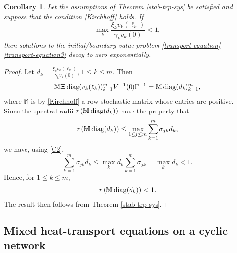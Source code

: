 \documentclass[a4paper,11pt,reqno]{amsart}
\theoremstyle{plain}
\newtheorem{corollary}{Corollary}[section]
\numberwithin{equation}{section}
\begin{document}
\begin{corollary}
Let the assumptions of Theorem \ref{stab-trp-sys} be satisfied and suppose that the condition \eqref{Kirchhoff} holds. If 
\begin{equation}\label{C2}
\max_{k}\frac{\xi_kv_k(\ell_k)}{\gamma_kv_k(0)}<1,
\end{equation}
then solutions to the initial/boundary-value problem \eqref{transport-equation}--\eqref{transport-equation3} decay to zero exponentially.
\end{corollary}
\begin{proof}
Let $d_k = \frac{\xi_kv_k(\ell_k)}{\gamma_kv_k(0)}$, $1 \le k\le m$. Then
\begin{equation*}
\mathbb{M}\Xi \, {\rm diag}(v_k(\ell_{k}))_{k=1}^m V^{-1}(0)\Gamma^{-1}=\mathbb{M}\, {\rm diag}(d_k )_{k=1}^m,
\end{equation*}
where $\mathbb{M}$ is by \eqref{Kirchhoff} a row-stochastic matrix whose entries are positive. Since the spectral radii $r\left( \mathbb{M} \, {\rm diag}(d_k) \right)$ have the property that 
\begin{equation*}
r\left( \mathbb{M} \, {\rm diag}(d_k) \right) 
\le \max_{1 \le j\le m} \sum_{k=1}^m \sigma_{jk} d_k,
\end{equation*}
we have, using \eqref{C2},
\begin{equation*}
\sum_{k=1}^m \sigma_{jk} d_k 
\le \max_k d_k \sum_{k=1}^m \sigma_{jk} 
= \max_k d_k < 1.
\end{equation*}
Hence, for $1 \le k\le m$,
\begin{equation*}
r\left( \mathbb{M} \, {\rm diag}(d_k) \right) < 1.
\end{equation*}
The result then follows from Theorem \ref{stab-trp-sys}.
\end{proof}

\subsection{Mixed heat-transport equations on a cyclic network}
\end{document}
